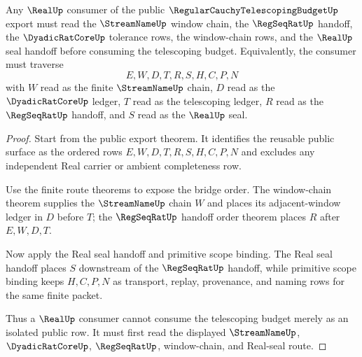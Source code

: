 \begin{theorem}
\label{thm:regular-cauchy-telescoping-budget-bridge-route}
Any $\RealUp$ consumer of the public $\RegularCauchyTelescopingBudgetUp$ export must read the $\StreamNameUp$ window chain, the $\RegSeqRatUp$ handoff, the $\DyadicRatCoreUp$ tolerance rows, the window-chain rows, and the $\RealUp$ seal handoff before consuming the telescoping budget. Equivalently, the consumer must traverse
$$
E,W,D,T,R,S,H,C,P,N
$$
with $W$ read as the finite $\StreamNameUp$ chain, $D$ read as the $\DyadicRatCoreUp$ ledger, $T$ read as the telescoping ledger, $R$ read as the $\RegSeqRatUp$ handoff, and $S$ read as the $\RealUp$ seal.
\end{theorem}
\begin{proof}
Start from the public export theorem. It identifies the reusable public surface as the ordered rows $E,W,D,T,R,S,H,C,P,N$ and excludes any independent Real carrier or ambient completeness row.

Use the finite route theorems to expose the bridge order. The window-chain theorem supplies the $\StreamNameUp$ chain $W$ and places its adjacent-window ledger in $D$ before $T$; the $\RegSeqRatUp$ handoff order theorem places $R$ after $E,W,D,T$.

Now apply the Real seal handoff and primitive scope binding. The Real seal handoff places $S$ downstream of the $\RegSeqRatUp$ handoff, while primitive scope binding keeps $H,C,P,N$ as transport, replay, provenance, and naming rows for the same finite packet.

Thus a $\RealUp$ consumer cannot consume the telescoping budget merely as an isolated public row. It must first read the displayed $\StreamNameUp$, $\DyadicRatCoreUp$, $\RegSeqRatUp$, window-chain, and Real-seal route.
\end{proof}

